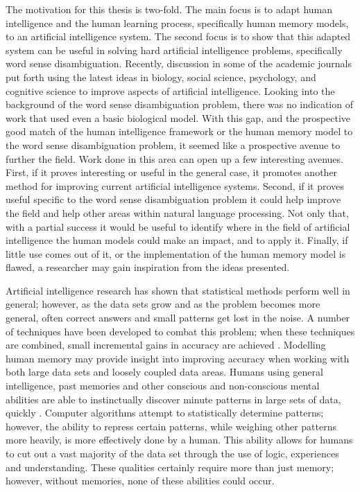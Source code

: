 The motivation for this thesis is two-fold.  The main focus is to adapt human
intelligence and the human learning process, specifically human memory models,
to an artificial intelligence system.  The second focus is to show that this
adapted system can be useful in solving hard artificial intelligence problems,
specifically word sense disambiguation.  Recently, discussion in some of the
academic journals put forth using the latest ideas in biology, social science,
psychology, and cognitive science to improve aspects of artificial intelligence.
Looking into the background of the word sense disambiguation problem, there was
no indication of work that used even a basic biological model. With this gap,
and the prospective good match of the human intelligence framework or the human
memory model to the word sense disambiguation problem, it seemed like a prospective
avenue to further the field.  Work done in this area can open up a few interesting
avenues. First, if it proves interesting or useful in the general case, it
promotes another method for improving current artificial intelligence systems.
Second, if it proves useful specific to the word sense disambiguation problem it
could help improve the field and help other areas within natural language
processing.  Not only that, with a partial success it would be useful to
identify where in the field of artificial intelligence the human models could
make an impact, and to apply it.  Finally, if little use comes out of it, or the
implementation of the human memory model is flawed, a researcher may gain
inspiration from the ideas presented.

Artificial intelligence research has shown that statistical methods perform well
in general; however, as the data sets grow and as the problem becomes more general, 
often correct answers and small patterns get lost in the noise.  A number of techniques have been developed
to combat this problem; when these techniques are combined, small incremental
gains in accuracy are achieved \cite{ENSEMBLE2}.  Modelling human memory may
provide insight into improving accuracy when working with both large data sets
and loosely coupled data areas.  Humans using general intelligence, past
memories and other conscious and non-conscious mental abilities are able to
instinctually discover minute patterns in large sets of data, quickly
\cite{BLINK}.  Computer algorithms attempt to statistically determine patterns;
however, the ability to repress certain patterns, while weighing other patterns
more heavily, is more effectively done by a human.  This ability allows for
humans to cut out a vast majority of the data set through the use of logic,
experiences and understanding.  These qualities certainly require more than just
memory; however, without memories, none of these abilities could occur.

